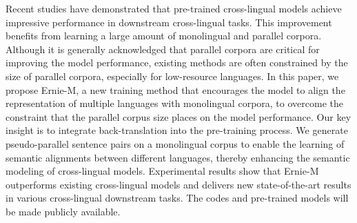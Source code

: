 Recent studies have demonstrated that pre-trained cross-lingual models achieve impressive performance in downstream cross-lingual tasks. This improvement benefits from learning a large amount of monolingual and parallel corpora. Although it is generally acknowledged that parallel corpora are critical for improving the model performance, existing methods are often constrained by the size of parallel corpora, especially for low-resource languages. In this paper, we propose Ernie-M, a new training method that encourages the model to align the representation of multiple languages with monolingual corpora, to overcome the constraint that the parallel corpus size places on the model performance. Our key insight is to integrate back-translation into the pre-training process. We generate pseudo-parallel sentence pairs on a monolingual corpus to enable the learning of semantic alignments between different languages, thereby enhancing the semantic modeling of cross-lingual models. Experimental results show that Ernie-M outperforms existing cross-lingual models and delivers new state-of-the-art results in various cross-lingual downstream tasks. The codes and pre-trained models will be made publicly available.
